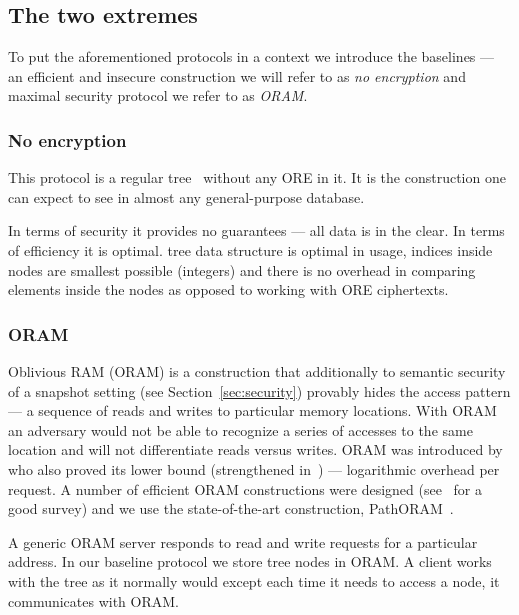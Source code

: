 \subsection{The two extremes}

	To put the aforementioned protocols in a context we introduce the baselines --- an efficient and insecure construction we will refer to as \emph{no encryption} and maximal security protocol we refer to as \emph{ORAM}.

	\subsubsection{No encryption}

		This protocol is a regular {\BPlus} tree~\cite{b-tree} without any ORE in it.
		It is the construction one can expect to see in almost any general-purpose database.

		In terms of security it provides no guarantees --- all data is in the clear.
		In terms of efficiency it is optimal.
		{\BPlus} tree data structure is optimal in {\IO} usage, indices inside nodes are smallest possible (integers) and there is no overhead in comparing elements inside the nodes as opposed to working with ORE ciphertexts.

	\subsubsection{ORAM}\label{sec:oram}

		Oblivious RAM (ORAM) is a construction that additionally to semantic security of a snapshot setting (see Section~\ref{sec:security}) provably hides the access pattern --- a sequence of reads and writes to particular memory locations.
		With ORAM an adversary would not be able to recognize a series of accesses to the same location and will not differentiate reads versus writes.
		ORAM was introduced by~\textcite{oram-original} who also proved its lower bound (strengthened in~\cite{oram-tighter-lower-bound}) --- logarithmic overhead per request.
		A number of efficient ORAM constructions were designed (see~\cite{oram-survey-feifei} for a good survey) and we use the state-of-the-art construction, PathORAM~\cite{path-oram}.

		A generic ORAM server responds to read and write requests for a particular address.
		In our baseline protocol we store {\BPlus} tree nodes in ORAM\@.
		A client works with the tree as it normally would except each time it needs to access a node, it communicates with ORAM\@.

